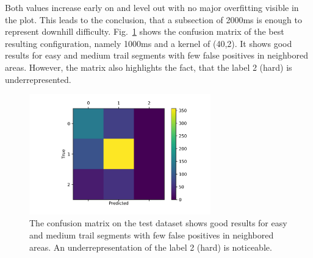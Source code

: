 \documentclass[runningheads]{llncs}
\begin{document}
\FloatBarrier

Both values increase early on and level out with no major overfitting visible in the plot.
This leads to the conclusion, that a subsection of 2000ms is enough to represent downhill difficulty.
Fig.~\ref{fig3} shows the confusion matrix of the best resulting configuration, namely 1000ms and a kernel of (40,2).
It shows good results for easy and medium trail segments with few false positives in neighbored areas. 
However, the matrix also highlights the fact, that the label 2 (hard) is underrepresented.


\begin{figure}
\centering 
\includegraphics[width=0.70\textwidth]{confusionmatrix.png}
\caption{The confusion matrix on the test dataset shows good results for easy and medium trail segments with few false positives in neighbored areas. An underrepresentation of the label 2 (hard) is noticeable.}
\label{fig3}	
\end{figure}
\end{document}
